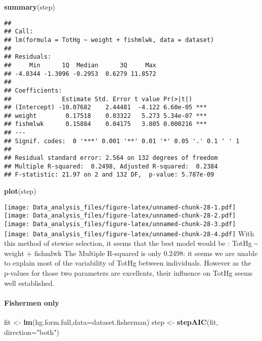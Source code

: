 \documentclass[12pt,]{article}
\newenvironment{Shaded}{\begin{snugshade}}{\end{snugshade}}
\newcommand{\KeywordTok}[1]{\textcolor[rgb]{0.13,0.29,0.53}{\textbf{#1}}}
\newcommand{\DataTypeTok}[1]{\textcolor[rgb]{0.13,0.29,0.53}{#1}}
\newcommand{\StringTok}[1]{\textcolor[rgb]{0.31,0.60,0.02}{#1}}
\newcommand{\NormalTok}[1]{#1}
\let\oldparagraph\paragraph
\renewcommand{\paragraph}[1]{\oldparagraph{#1}\mbox{}}
\begin{document}
\begin{Shaded}
\begin{Highlighting}[]
\KeywordTok{summary}\NormalTok{(step)}
\end{Highlighting}
\end{Shaded}

\begin{verbatim}
## 
## Call:
## lm(formula = TotHg ~ weight + fishmlwk, data = dataset)
## 
## Residuals:
##     Min      1Q  Median      3Q     Max 
## -4.8344 -1.3096 -0.2953  0.6279 11.8572 
## 
## Coefficients:
##              Estimate Std. Error t value Pr(>|t|)    
## (Intercept) -10.07682    2.44481  -4.122 6.60e-05 ***
## weight        0.17518    0.03322   5.273 5.34e-07 ***
## fishmlwk      0.15884    0.04175   3.805 0.000216 ***
## ---
## Signif. codes:  0 '***' 0.001 '**' 0.01 '*' 0.05 '.' 0.1 ' ' 1
## 
## Residual standard error: 2.564 on 132 degrees of freedom
## Multiple R-squared:  0.2498, Adjusted R-squared:  0.2384 
## F-statistic: 21.97 on 2 and 132 DF,  p-value: 5.787e-09
\end{verbatim}

\begin{Shaded}
\begin{Highlighting}[]
\KeywordTok{plot}\NormalTok{(step)}
\end{Highlighting}
\end{Shaded}

\texttt{[image: Data\_analysis\_files/figure-latex/unnamed-chunk-28-1.pdf]}
\texttt{[image: Data\_analysis\_files/figure-latex/unnamed-chunk-28-2.pdf]}
\texttt{[image: Data\_analysis\_files/figure-latex/unnamed-chunk-28-3.pdf]}
\texttt{[image: Data\_analysis\_files/figure-latex/unnamed-chunk-28-4.pdf]}
With this method of stewise selection, it seems that the best model
would be : TotHg \textasciitilde{} weight + fishmlwk The Multiple
R-squared is only 0.2498: it seems we are unable to explain most of the
variability of TotHg between individuals. However as the p-values for
those two parameters are excellents, their influence on TotHg seems well
established.

\paragraph{Fishermen only}\label{fishermen-only}

\begin{Shaded}
\begin{Highlighting}[]
\NormalTok{fit <-}\StringTok{ }\KeywordTok{lm}\NormalTok{(hg.form.full,}\DataTypeTok{data=}\NormalTok{dataset.fisherman)}
\NormalTok{step <-}\StringTok{ }\KeywordTok{stepAIC}\NormalTok{(fit, }\DataTypeTok{direction=}\StringTok{"both"}\NormalTok{)}
\end{Highlighting}
\end{Shaded}
\end{document}
